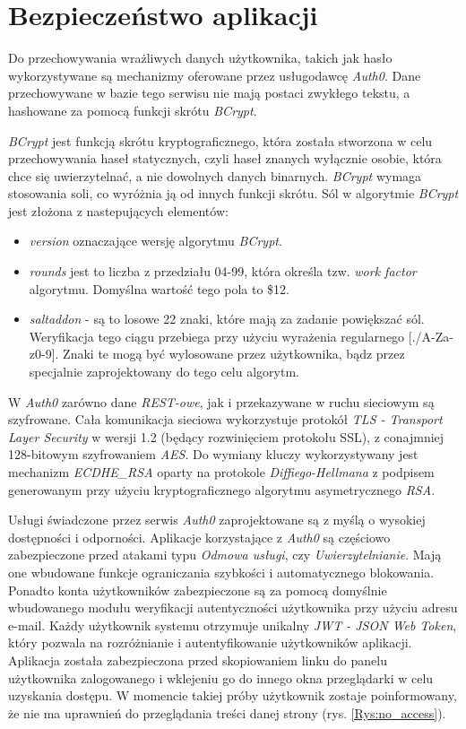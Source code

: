 \chapter{Bezpieczeństwo aplikacji}

Do przechowywania wrażliwych danych użytkownika, takich jak hasło wykorzystywane są mechanizmy oferowane przez usługodawcę \textit{Auth0}. Dane przechowywane w bazie tego serwisu nie mają postaci zwykłego tekstu, a hashowane za pomocą funkcji skrótu \textit{BCrypt}.

\textit{BCrypt} jest funkcją skrótu kryptograficznego, która została stworzona w celu przechowywania haseł statycznych, czyli haseł znanych wyłącznie osobie, która chce się uwierzytelnać, a nie dowolnych danych binarnych. \textit{BCrypt} wymaga stosowania soli, co wyróżnia ją od innych funkcji skrótu. Sól w algorytmie \textit{BCrypt} jest złożona z nastepujących elementów:

\begin{itemize}
	\item \textit{version} oznaczające wersję algorytmu \textit{BCrypt}.
	\item \textit{rounds} jest to liczba z przedziału 04-99, która określa tzw. \textit{work factor} algorytmu. Domyślna wartość tego pola to \$12.
	\item \textit{saltaddon} - są to losowe 22 znaki, które mają za zadanie powiększać sól. Weryfikacja tego ciągu przebiega przy użyciu wyrażenia regularnego [./A-Za-z0-9]. Znaki te mogą być wylosowane przez użytkownika, bądz przez specjalnie zaprojektowany do tego celu algorytm. 
\end{itemize}

W \textit{Auth0} zarówno dane \textit{REST-owe}, jak i przekazywane w ruchu sieciowym są szyfrowane. Cała komunikacja sieciowa wykorzystuje protokół \textit{TLS - Transport Layer Security} w wersji 1.2 (będący rozwinięciem protokołu SSL), z conajmniej 128-bitowym szyfrowaniem \textit{AES}. Do wymiany kluczy wykorzystywany jest mechanizm \textit{ECDHE\_RSA} oparty na protokole \textit{Diffiego-Hellmana} z podpisem generowanym przy użyciu kryptograficznego algorytmu asymetrycznego \textit{RSA}. 

Usługi świadczone przez serwis \textit{Auth0} zaprojektowane są z myślą o wysokiej dostępności i odporności. Aplikacje korzystające z \textit{Auth0} są częściowo zabezpieczone przed atakami typu \textit{Odmowa usługi}, czy \textit{Uwierzytelnianie}. Mają one wbudowane funkcje ograniczania szybkości i automatycznego blokowania. Ponadto konta użytkowników zabezpieczone są za pomocą domyślnie wbudowanego modułu weryfikacji autentyczności użytkownika przy użyciu adresu e-mail. Każdy użytkownik systemu otrzymuje unikalny \textit{JWT - JSON Web Token}, który pozwala na rozróżnianie i autentyfikowanie użytkowników aplikacji. Aplikacja została zabezpieczona przed skopiowaniem linku do panelu użytkownika zalogowanego i wklejeniu go do innego okna przeglądarki w celu uzyskania dostępu. W momencie takiej próby użytkownik zostaje poinformowany, że nie ma uprawnień do przeglądania treści danej strony (rys. \ref{Rys:no_access}). 

